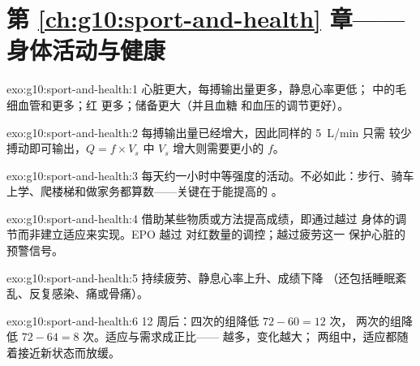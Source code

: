 \section*{第 \ref{ch:g10:sport-and-health} 章——身体活动与健康}

\begin{solution}{exo:g10:sport-and-health:1}
心脏更大，每搏输出量更多，静息心率更低；
中的毛细血管和更多；红
更多；储备更大（并且血糖
和血压的调节更好）。
\end{solution}

\begin{solution}{exo:g10:sport-and-health:2}
每搏输出量已经增大，因此同样的 \qty{5}{L/min} 只需
较少搏动即可输出，$Q = f \times V_s$ 中 $V_s$ 增大则需要更小的
$f$。
\end{solution}

\begin{solution}{exo:g10:sport-and-health:3}
每天约一小时中等强度的活动。不必如此：步行、骑车
上学、爬楼梯和做家务都算数——关键在于能提高的
。
\end{solution}

\begin{solution}{exo:g10:sport-and-health:4}
借助某些物质或方法提高成绩，即通过越过
身体的调节而非建立适应来实现。EPO 越过
对红数量的调控；越过疲劳这一
保护心脏的预警信号。
\end{solution}

\begin{solution}{exo:g10:sport-and-health:5}
持续疲劳、静息心率上升、成绩下降
（还包括睡眠紊乱、反复感染、痛或骨痛）。
\end{solution}

\begin{solution}{exo:g10:sport-and-health:6}
12 周后：四次的组降低 $72 - 60 = 12$ 次，
两次的组降低 $72 - 64 = 8$ 次。适应与需求成正比——
越多，变化越大；
两组中，适应都随着接近新状态而放缓。
\end{solution}

